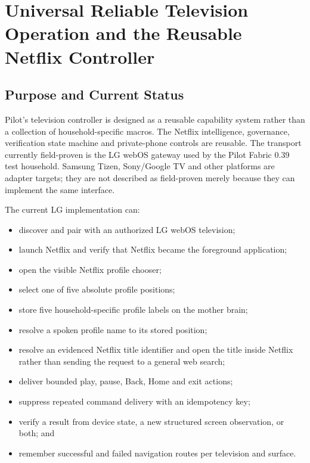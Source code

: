 \section{Universal Reliable Television Operation and the Reusable Netflix Controller}
\label{sec:pilot-universal-tv-controller}

\subsection{Purpose and Current Status}

Pilot's television controller is designed as a reusable capability system rather
than a collection of household-specific macros. The Netflix intelligence,
governance, verification state machine and private-phone controls are reusable.
The transport currently field-proven is the LG webOS gateway used by the Pilot
Fabric 0.39 test household. Samsung Tizen, Sony/Google TV and other platforms are
adapter targets; they are not described as field-proven merely because they can
implement the same interface.

The current LG implementation can:

\begin{itemize}
  \item discover and pair with an authorized LG webOS television;
  \item launch Netflix and verify that Netflix became the foreground application;
  \item open the visible Netflix profile chooser;
  \item select one of five absolute profile positions;
  \item store five household-specific profile labels on the mother brain;
  \item resolve a spoken profile name to its stored position;
  \item resolve an evidenced Netflix title identifier and open the title inside
        Netflix rather than sending the request to a general web search;
  \item deliver bounded play, pause, Back, Home and exit actions;
  \item suppress repeated command delivery with an idempotency key;
  \item verify a result from device state, a new structured screen observation,
        or both; and
  \item remember successful and failed navigation routes per television and
        surface.
\end{itemize}

